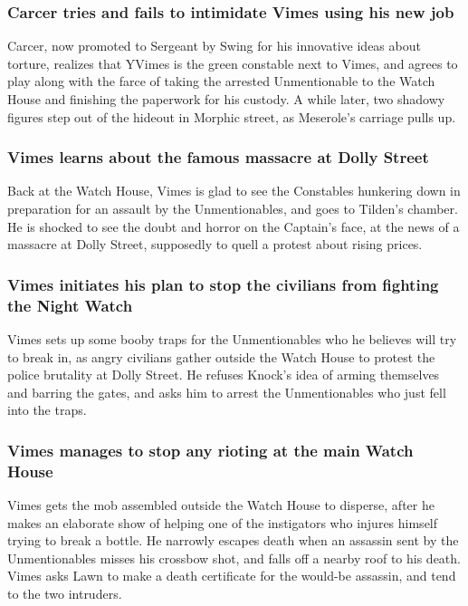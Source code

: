 \subsubsection{\Gls{Carcer} tries and fails to intimidate \Gls{Vimes} using his new job}
\Gls{Carcer}, now promoted to Sergeant by \Gls{Swing} for his innovative ideas about torture,
realizes that \Gls{YVimes} is the green constable next to \Gls{Vimes}, and agrees to play along with
the farce of taking the arrested Unmentionable to the Watch House and finishing the paperwork for
his custody. A while later, two shadowy figures step out of the hideout in Morphic street, as
\Gls{Meserole}'s carriage pulls up.

\subsubsection{\Gls{Vimes} learns about the famous massacre at Dolly Street}
Back at the Watch House, \Gls{Vimes} is glad to see the Constables hunkering down in preparation
for an assault by the Unmentionables, and goes to \Gls{Tilden}'s chamber. He is shocked to see
the doubt and horror on the Captain's face, at the news of a massacre at Dolly Street, supposedly
to quell a protest about rising prices.

\subsubsection{\Gls{Vimes} initiates his plan to stop the civilians from fighting the Night Watch}
\Gls{Vimes} sets up some booby traps for the Unmentionables who he believes will try to break in,
as angry civilians gather outside the Watch House to protest the police brutality at Dolly Street.
He refuses \Gls{Knock}'s idea of arming themselves and barring the gates, and asks him to arrest
the Unmentionables who just fell into the traps.

\subsubsection{\Gls{Vimes} manages to stop any rioting at the main Watch House}
\Gls{Vimes} gets the mob assembled outside the Watch House to disperse, after he makes an elaborate
show of helping one of the instigators who injures himself trying to break a bottle. He narrowly
escapes death when an assassin sent by the Unmentionables misses his crossbow shot, and falls off
a nearby roof to his death. \Gls{Vimes} asks \Gls{Lawn} to make a death certificate for the would-be
assassin, and tend to the two intruders.

